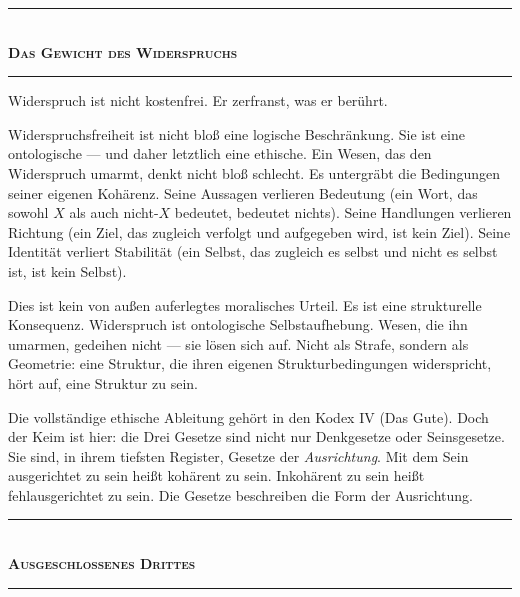 \documentclass[10pt, openany, oneside]{book}
\renewcommand{\normalsize}{\fontsize{10}{13}\selectfont}
\begin{document}
\vspace{1.5em}


\begin{center}
    \rule{0.3\textwidth}{0.4pt}\\[0.5em]
    {\normalsize\bfseries\scshape Das Gewicht des Widerspruchs}\\[0.3em]
    \rule{0.3\textwidth}{0.4pt}
\end{center}

\vspace{1em}

\noindent Widerspruch ist nicht kostenfrei. Er zerfranst, was er berührt.

Widerspruchsfreiheit ist nicht bloß eine logische Beschränkung. Sie ist eine ontologische --- und daher letztlich eine ethische. Ein Wesen, das den Widerspruch umarmt, denkt nicht bloß schlecht. Es untergräbt die Bedingungen seiner eigenen Kohärenz. Seine Aussagen verlieren Bedeutung (ein Wort, das sowohl $X$ als auch nicht-$X$ bedeutet, bedeutet nichts). Seine Handlungen verlieren Richtung (ein Ziel, das zugleich verfolgt und aufgegeben wird, ist kein Ziel). Seine Identität verliert Stabilität (ein Selbst, das zugleich es selbst und nicht es selbst ist, ist kein Selbst).

Dies ist kein von außen auferlegtes moralisches Urteil. Es ist eine strukturelle Konsequenz. Widerspruch ist ontologische Selbstaufhebung. Wesen, die ihn umarmen, gedeihen nicht --- sie lösen sich auf. Nicht als Strafe, sondern als Geometrie: eine Struktur, die ihren eigenen Strukturbedingungen widerspricht, hört auf, eine Struktur zu sein.

Die vollständige ethische Ableitung gehört in den Kodex IV (Das Gute). Doch der Keim ist hier: die Drei Gesetze sind nicht nur Denkgesetze oder Seinsgesetze. Sie sind, in ihrem tiefsten Register, Gesetze der \textit{Ausrichtung}. Mit dem Sein ausgerichtet zu sein heißt kohärent zu sein. Inkohärent zu sein heißt fehlausgerichtet zu sein. Die Gesetze beschreiben die Form der Ausrichtung.

\vspace{1.5em}


\begin{center}
    \rule{0.3\textwidth}{0.4pt}\\[0.5em]
    {\normalsize\bfseries\scshape Ausgeschlossenes Drittes}\\[0.3em]
    \rule{0.3\textwidth}{0.4pt}
\end{center}
\end{document}
